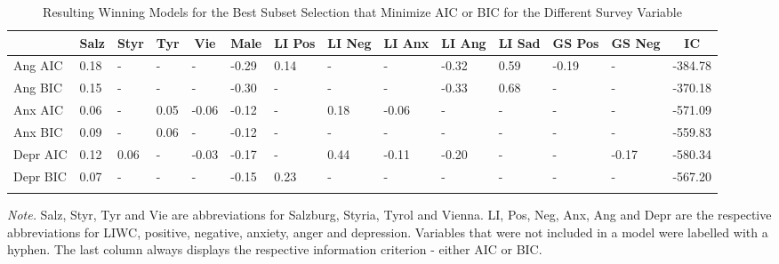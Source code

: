 \documentclass[
  english,
  jou,floatsintext]{apa7}
\begin{document}
\begin{table}[h!]

\begin{center}
\begin{threeparttable}

\caption{\label{tab:subset}Resulting Winning Models for the Best Subset Selection that Minimize AIC or BIC for the Different Survey Variable}

\small{

\begin{tabular}{llllllllllllll}
\toprule
 & \multicolumn{1}{c}{Salz} & \multicolumn{1}{c}{Styr} & \multicolumn{1}{c}{Tyr} & \multicolumn{1}{c}{Vie} & \multicolumn{1}{c}{Male} & \multicolumn{1}{c}{LI Pos} & \multicolumn{1}{c}{LI Neg} & \multicolumn{1}{c}{LI Anx} & \multicolumn{1}{c}{LI Ang} & \multicolumn{1}{c}{LI Sad} & \multicolumn{1}{c}{GS Pos} & \multicolumn{1}{c}{GS Neg} & \multicolumn{1}{c}{IC}\\
\midrule
Ang AIC & 0.18 & - & - & - & -0.29 & 0.14 & - & - & -0.32 & 0.59 & -0.19 & - & -384.78\\
Ang BIC & 0.15 & - & - & - & -0.30 & - & - & - & -0.33 & 0.68 & - & - & -370.18\\
Anx AIC & 0.06 & - & 0.05 & -0.06 & -0.12 & - & 0.18 & -0.06 & - & - & - & - & -571.09\\
Anx BIC & 0.09 & - & 0.06 & - & -0.12 & - & - & - & - & - & - & - & -559.83\\
Depr AIC & 0.12 & 0.06 & - & -0.03 & -0.17 & - & 0.44 & -0.11 & -0.20 & - & - & -0.17 & -580.34\\
Depr BIC & 0.07 & - & - & - & -0.15 & 0.23 & - & - & - & - & - & - & -567.20\\
\bottomrule
\addlinespace
\end{tabular}

}

\begin{tablenotes}[para]
\normalsize{\textit{Note.} Salz, Styr, Tyr and Vie are abbreviations for Salzburg, Styria, Tyrol and Vienna. LI, Pos, Neg, Anx, Ang and Depr are the respective abbreviations for LIWC, positive, negative, anxiety, anger and depression. Variables that were not included in a model were labelled with a hyphen. The last column always displays the respective information criterion - either AIC or BIC.}
\end{tablenotes}

\end{threeparttable}
\end{center}

\end{table}
\end{document}
